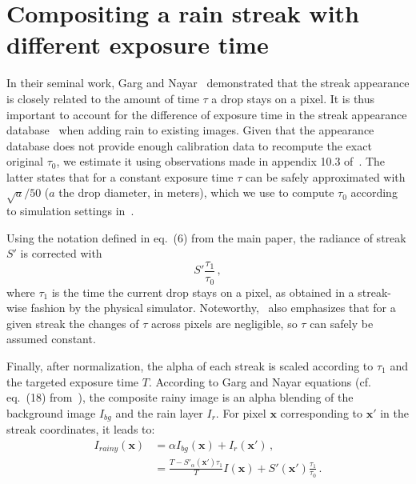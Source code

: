 \section{Compositing a rain streak with different exposure time}
\label{sec:app-comp_diff_exp}

In their seminal work, Garg and Nayar~\cite{garg2005does} demonstrated that the streak appearance is closely related to the amount of time $\tau$ a drop stays on a pixel.
It is thus important to account for the difference of exposure time in the streak appearance database~\cite{garg2006photorealistic} when adding rain to existing images. 
Given that the appearance database does not provide enough calibration data to recompute the exact original $\tau_0$, we estimate it using observations made in appendix 10.3 of~\cite{garg2007vision}.
The latter states that for a constant exposure time $\tau$ can be safely approximated with $\sqrt{a}/50$ ($a$ the drop diameter, in meters), which we use to compute $\tau_0$ according to simulation settings in~\cite{garg2006photorealistic}.

Using the notation defined in eq.~(6) from the main paper, the radiance of streak $S'$ is corrected with
\begin{equation}
S'\frac{\tau_1}{\tau_0}\,,
\end{equation}
where $\tau_1$ is the time the current drop stays on a pixel, as obtained in a streak-wise fashion by the physical simulator. Noteworthy,~\cite{garg2007vision} also emphasizes that for a given streak the changes of $\tau$ across pixels are negligible, so $\tau$ can safely be assumed constant.

Finally, after normalization, the alpha of each streak is scaled according to $\tau_1$ and the targeted exposure time $T$. 
According to Garg and Nayar equations (cf. eq.~(18) from~\cite{garg2007vision}), the composite rainy image is an alpha blending of the background image $I_{bg}$ and the rain layer $I_r$. For pixel $\mathbf{x}$ corresponding to $\mathbf{x'}$ in the streak coordinates, it leads to:
\begin{equation}
\begin{split}
I_{rainy}(\mathbf{x}) &= \alpha{}I_{bg}(\mathbf{x}) + I_{r}(\mathbf{x'})\,,\\
 &= \frac{T-S'_{\alpha}(\mathbf{x'})\tau_1}{T}I(\mathbf{x}) + S'(\mathbf{x'})\frac{\tau_1}{\tau_0}\,.\\
\end{split}
\end{equation}